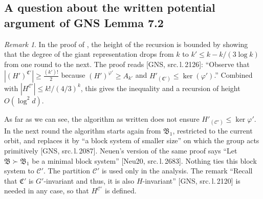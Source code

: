 \documentclass[11pt]{article}
\theoremstyle{plain}
\theoremstyle{definition}
\theoremstyle{remark}
\newtheorem{remark}[theorem]{Remark}
\theoremstyle{named}
\theoremstyle{namedrm}
\newcommand{\fB}{\mathfrak{B}}
\newcommand{\Cp}{\mathcal{C}'}
\newcommand{\src}[2]{[#1, src.\,l.\,#2]}
\begin{document}
\subsection{A question about the written potential argument of GNS Lemma 7.2}

\begin{remark}\label{rem:gap1}
In the proof of \cite[Lemma~7.2]{GNS}, the height of the recursion is bounded by showing that the
degree of the giant representation drops from $k$ to $k'\le k-k/(3\log k)$ from one round to the next.
The proof reads \src{GNS}{2126}: ``Observe that $|(H')^{\mathfrak C'}|\ge\frac{(k')!}{2}$ because
$(H')^{\varphi'}\ge A_{k'}$ and $H'_{(\mathfrak C')}\le\ker(\varphi')$.'' Combined with
$|H^{\Cp}|\le k!/(4/3)^k$, this gives the inequality and a recursion of height $O(\log^2d)$.

As far as we can see, the algorithm as written does not ensure $H'_{(\Cp)}\le\ker\varphi'$. In the next round
the algorithm starts again from $\fB_1$, restricted to the current orbit, and replaces it by ``a block system
of smaller size'' on which the group acts primitively \src{GNS}{2087}. Neuen's version of the same proof
says ``Let $\mathfrak B\succ\mathfrak B_1$ be a minimal block system'' \src{Neu20}{2683}. Nothing ties this
block system to $\Cp$. The partition $\Cp$ is used only in the analysis. The remark ``Recall that
$\mathfrak C'$ is $G'$-invariant and thus, it is also $H$-invariant'' \src{GNS}{2120} is needed in any case,
so that $H^{\Cp}$ is defined.


\end{remark}
\end{document}

